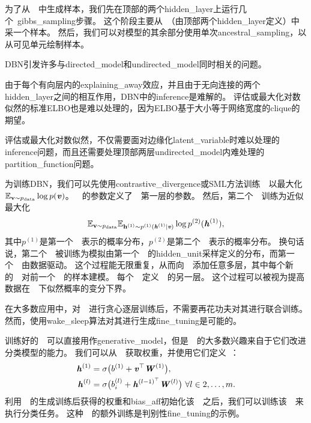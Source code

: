 
为了从~~中生成样本，我们先在顶部的两个\gls{hidden_layer}上运行几个~\gls{gibbs_sampling}步骤。
这个阶段主要从~（由顶部两个\gls{hidden_layer}定义）中采一个样本。
然后，我们可以对模型的其余部分使用单次\gls{ancestral_sampling}，以从可见单元绘制样本。

\gls{DBN}引发许多与\gls{directed_model}和\gls{undirected_model}同时相关的问题。

由于每个有向层内的\gls{explaining_away}效应，并且由于无向连接的两个\gls{hidden_layer}之间的相互作用，\gls{DBN}中的\gls{inference}是难解的。
评估或最大化对数似然的标准\gls{ELBO}也是难以处理的，因为\gls{ELBO}基于大小等于网络宽度的\gls{clique}的期望。

评估或最大化对数似然，不仅需要面对边缘化\gls{latent_variable}时难以处理的\gls{inference}问题，而且还需要处理顶部两层\gls{undirected_model}内难处理的\gls{partition_function}问题。

为训练\gls{DBN}，我们可以先使用\gls{contrastive_divergence}或\gls{SML}方法训练~~以最大化$ \mathbb{E}_{\mathbf{v} \sim p_{\text{data}}} \log p(\boldsymbol{\mathit{v}})$。
\,~的参数定义了~~第一层的参数。
然后，第二个~~训练为近似最大化
\begin{align}
 \mathbb{E}_{\mathbf{v} \sim p_{\text{data}}}  \mathbb{E}_{\mathbf{h}^{(1)} \sim p^{(1)}(\boldsymbol{\mathit{h}}^{(1)}  \mid  \boldsymbol{\mathit{v}})}  \log p^{(2)}(\boldsymbol{\mathit{h}}^{(1)}) ,
\end{align}
其中$p^{(1)}$是第一个~~表示的概率分布，$p^{(2)}$是第二个~~表示的概率分布。
换句话说，第二个~~被训练为模拟由第一个~~的\gls{hidden_unit}采样定义的分布，而第一个~~由数据驱动。
这个过程能无限重复，从而向~~添加任意多层，其中每个新的~~对前一个~~的样本建模。
每个~~定义~~的另一层。
这个过程可以被视为提高数据在~~下似然概率的变分下界\citep{Hinton06}。


在大多数应用中，对~~进行贪心逐层训练后，不需要再花功夫对其进行联合训练。
然而，使用\gls{wake_sleep}算法对其进行生成\gls{fine_tuning}是可能的。


训练好的~~可以直接用作\gls{generative_model}，但是~~的大多数兴趣来自于它们改进分类模型的能力。
我们可以从~~获取权重，并使用它们定义~：
\begin{align}
 \boldsymbol{\mathit{h}}^{(1)} &= \sigma \big( b^{(1)} + \boldsymbol{\mathit{v}}^\top \boldsymbol{\mathit{W}}^{(1)} \big), \\
 \boldsymbol{\mathit{h}}^{(l)} &= \sigma \big( b_i^{(l)} + \boldsymbol{\mathit{h}}^{(l-1)^\top}\boldsymbol{\mathit{W}}^{(l)} \big) ~\forall l \in 2, \ldots, m.
\end{align}
利用~~的生成训练后获得的权重和\gls{bias_aff}初始化该~~之后，我们可以训练该~~来执行分类任务。
这种~~的额外训练是判别性\gls{fine_tuning}的示例。


